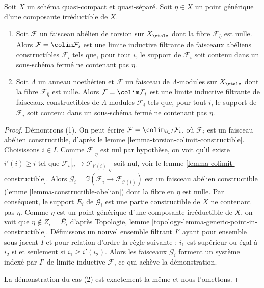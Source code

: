 \begin{lemma}
\label{lemma-zero-in-generic-point}
Soit $X$ un schéma quasi-compact et quasi-séparé. Soit
$\eta \in X$ un point générique d'une composante irréductible de $X$.
\begin{enumerate}
\item Soit $\mathcal{F}$ un faisceau abélien de torsion sur $X_\etale$
dont la fibre $\mathcal{F}_{\overline{\eta}}$ est nulle.
Alors $\mathcal{F} = \colim \mathcal{F}_i$ est une limite inductive filtrante de
faisceaux abéliens constructibles $\mathcal{F}_i$ tels que, pour tout $i$,
le support de $\mathcal{F}_i$ soit contenu
dans un sous-schéma fermé ne contenant pas $\eta$.
\item Soit $\Lambda$ un anneau noethérien et $\mathcal{F}$ un faisceau
de $\Lambda$-modules sur $X_\etale$ dont la fibre
$\mathcal{F}_{\overline{\eta}}$ est nulle. Alors
$\mathcal{F} = \colim \mathcal{F}_i$
est une limite inductive filtrante de faisceaux constructibles de
$\Lambda$-modules $\mathcal{F}_i$ tels que, pour tout $i$,
le support de $\mathcal{F}_i$ soit contenu dans un sous-schéma fermé
ne contenant pas $\eta$.
\end{enumerate}
\end{lemma}

\begin{proof}
Démontrons (1). On peut écrire $\mathcal{F} = \colim_{i \in I} \mathcal{F}_i$,
où $\mathcal{F}_i$ est un faisceau abélien constructible, d'après le
lemme \ref{lemma-torsion-colimit-constructible}.
Choisissons $i \in I$. Comme $\mathcal{F}|_\eta$ est nul par hypothèse, on
voit qu'il existe $i'(i) \geq i$ tel que
$\mathcal{F}_i|_\eta \to \mathcal{F}_{i'(i)}|_\eta$ soit nul, voir le
lemme \ref{lemma-colimit-constructible}.
Alors $\mathcal{G}_i = \Im(\mathcal{F}_i \to \mathcal{F}_{i'(i)})$
est un faisceau abélien constructible (lemme \ref{lemma-constructible-abelian})
dont la fibre en $\eta$ est nulle.
Par conséquent, le support $E_i$ de $\mathcal{G}_i$ est une partie constructible
de $X$ ne contenant pas $\eta$. Comme
$\eta$ est un point générique d'une composante irréductible de
$X$, on voit que $\eta \not \in Z_i = \overline{E_i}$ d'après
Topologie, lemme \ref{topology-lemma-generic-point-in-constructible}.
Définissons un nouvel ensemble filtrant $I'$ ayant pour ensemble sous-jacent $I$ et
pour relation d'ordre la règle suivante :
$i_1$ est supérieur ou égal à $i_2$ si et seulement si $i_1 \geq i'(i_2)$.
Alors les faisceaux $\mathcal{G}_i$ forment un système indexé par $I'$
de limite inductive $\mathcal{F}$, ce qui achève la démonstration.

\medskip\noindent
La démonstration du cas (2) est exactement la même et nous l'omettons.
\end{proof}








